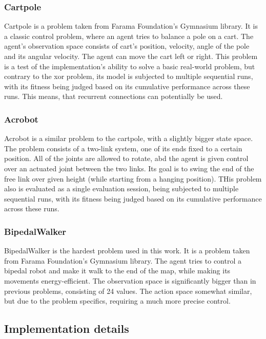 \documentclass{article}
\begin{document}
        \subsubsection{Cartpole}
        Cartpole is a problem taken from Farama Foundation's Gymnasium library. It is a classic control problem, 
        where an agent tries to balance a pole on a cart. The agent's observation space consists of cart's 
        position, velocity, angle of the pole and its angular velocity. The agent can move the cart left or right.
        This problem is a test of the implementation's ability to solve a basic real-world problem, but contrary 
        to the xor problem, its model is subjected to multiple sequential runs,
        with its fitness being judged based on its cumulative performance across these runs. This means, that
        recurrent connections can potentially be used.
        \subsubsection{Acrobot}
        Acrobot is a similar problem to the cartpole, with a slightly bigger state space. The problem consists
        of a two-link system, one of its ends fixed to a certain position. All of the joints are allowed to rotate,
        abd the agent is given control over an actuated joint between the two links. Its goal is to swing the
        end of the free link over given height (while starting from a hanging position). 
        THis problem also is evaluated as a single evaluation session, being subjected to multiple sequential runs,
        with its fitness being judged based on its cumulative performance across these runs.
        \subsubsection{BipedalWalker}
        BipedalWalker is the hardest problem used in this work. It is a problem taken from Farama Foundation's
        Gymnasium library. The agent tries to control a bipedal robot and make it walk to the end of the map, while
        making its movements energy-efficient. The observation space is significantly bigger than in previous problems,
        consisting of 24 values. The action space somewhat similar, but due to the problem specifics, requiring a 
        much more precise control. 
    \subsection{Implementation details}
\end{document}
